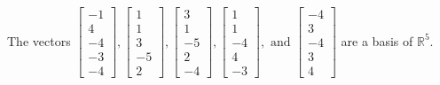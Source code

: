 \begin{exercise}
\begin{exerciseStatement}
  \end{exerciseStatement}
  \begin{exerciseAnswer}
   The vectors \(\left[\begin{array}{r}
-1 \\
4 \\
-4 \\
-3 \\
-4
\end{array}\right] , \left[\begin{array}{r}
1 \\
1 \\
3 \\
-5 \\
2
\end{array}\right] , \left[\begin{array}{r}
3 \\
1 \\
-5 \\
2 \\
-4
\end{array}\right] , \left[\begin{array}{r}
1 \\
1 \\
-4 \\
4 \\
-3
\end{array}\right] , \text{ and } \left[\begin{array}{r}
-4 \\
3 \\
-4 \\
3 \\
4
\end{array}\right]\) 
  	 are  a basis of \(\mathbb{R}^5\).
  


  \end{exerciseAnswer}
\end{exercise}